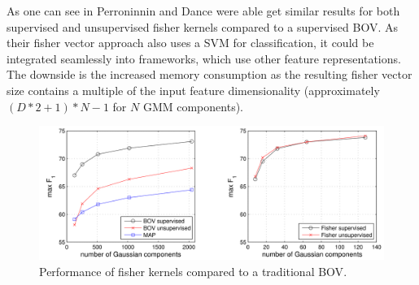 As one can see in  Perroninnin and Dance were able get similar results for both supervised and unsupervised fisher kernels compared to a supervised \ac{BOV}. As their fisher vector approach also uses a \ac{SVM} for classification, it could be integrated seamlessly into frameworks, which use other feature representations. The downside is the increased memory consumption as the resulting fisher vector size contains a multiple of the input feature dimensionality (approximately $(D*2+1)*N-1$ for $N$ \ac{GMM} components).

\begin{figure}
\includegraphics[width=\linewidth]{images/fisher_kernel_performance}
\caption{Performance of fisher kernels compared to a traditional \acs{BOV}.}
\label{fig:fisher_kernel_performance}
\end{figure}

\FloatBarrier
